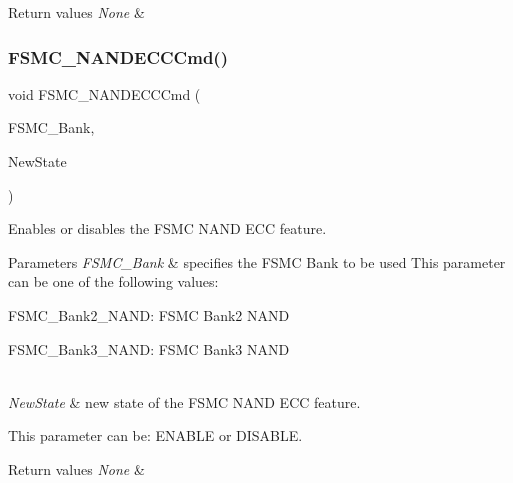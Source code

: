 \begin{DoxyRetVals}{Return values}
{\em None} & \\
\hline
\end{DoxyRetVals}
\mbox{\label{group___f_s_m_c___private___functions_ga5800301fc39bbe998a18ebd9ff191cdc}} 
\subsubsection{\texorpdfstring{FSMC\_NANDECCCmd()}{FSMC\_NANDECCCmd()}}
{\footnotesize\ttfamily void F\+S\+M\+C\+\_\+\+N\+A\+N\+D\+E\+C\+C\+Cmd (\begin{DoxyParamCaption}\item[{uint32\+\_\+t}]{F\+S\+M\+C\+\_\+\+Bank,  }\item[{\mbox{\hyperlink{group___exported__types_gac9a7e9a35d2513ec15c3b537aaa4fba1}{Functional\+State}}}]{New\+State }\end{DoxyParamCaption})}



Enables or disables the F\+S\+MC N\+A\+ND E\+CC feature. 


\begin{DoxyParams}{Parameters}
{\em F\+S\+M\+C\+\_\+\+Bank} & specifies the F\+S\+MC Bank to be used This parameter can be one of the following values\+: \begin{DoxyItemize}
\item F\+S\+M\+C\+\_\+\+Bank2\+\_\+\+N\+A\+ND\+: F\+S\+MC Bank2 N\+A\+ND \item F\+S\+M\+C\+\_\+\+Bank3\+\_\+\+N\+A\+ND\+: F\+S\+MC Bank3 N\+A\+ND \end{DoxyItemize}
\\
\hline
{\em New\+State} & new state of the F\+S\+MC N\+A\+ND E\+CC feature.\\
\hline
\end{DoxyParams}
This parameter can be\+: E\+N\+A\+B\+LE or D\+I\+S\+A\+B\+LE. 
\begin{DoxyRetVals}{Return values}
{\em None} & \\
\hline
\end{DoxyRetVals}
\mbox{\label{group___f_s_m_c___private___functions_ga9f81ccc4e126c11f1eb33077b1a68e6f}} 
